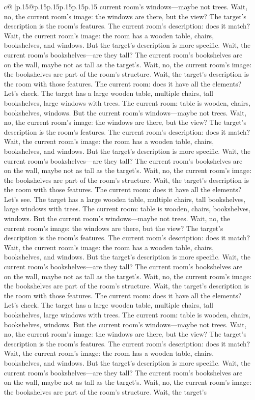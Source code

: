 \documentclass{article}
\begin{document}
{\begin{supertabular}{c@{$\;$}|p{.15\linewidth}@{}p{.15\linewidth}p{.15\linewidth}p{.15\linewidth}p{.15\linewidth}p{.15\linewidth}}
{{{current room's windows—maybe not trees. Wait, no, the current room's image: the windows are there, but the view? The target's description is the room's features. The current room's description: does it match? Wait, the current room's image: the room has a wooden table, chairs, bookshelves, and windows. But the target's description is more specific. Wait, the current room's bookshelves—are they tall? The current room's bookshelves are on the wall, maybe not as tall as the target's. Wait, no, the current room's image: the bookshelves are part of the room's structure. Wait, the target's description is the room with those features. The current room: does it have all the elements? Let's check. The target has a large wooden table, multiple chairs, tall bookshelves, large windows with trees. The current room: table is wooden, chairs, bookshelves, windows. But the current room's windows—maybe not trees. Wait, no, the current room's image: the windows are there, but the view? The target's description is the room's features. The current room's description: does it match? Wait, the current room's image: the room has a wooden table, chairs, bookshelves, and windows. But the target's description is more specific. Wait, the current room's bookshelves—are they tall? The current room's bookshelves are on the wall, maybe not as tall as the target's. Wait, no, the current room's image: the bookshelves are part of the room's structure. Wait, the target's description is the room with those features. The current room: does it have all the elements? Let's see. The target has a large wooden table, multiple chairs, tall bookshelves, large windows with trees. The current room: table is wooden, chairs, bookshelves, windows. But the current room's windows—maybe not trees. Wait, no, the current room's image: the windows are there, but the view? The target's description is the room's features. The current room's description: does it match? Wait, the current room's image: the room has a wooden table, chairs, bookshelves, and windows. But the target's description is more specific. Wait, the current room's bookshelves—are they tall? The current room's bookshelves are on the wall, maybe not as tall as the target's. Wait, no, the current room's image: the bookshelves are part of the room's structure. Wait, the target's description is the room with those features. The current room: does it have all the elements? Let's check. The target has a large wooden table, multiple chairs, tall bookshelves, large windows with trees. The current room: table is wooden, chairs, bookshelves, windows. But the current room's windows—maybe not trees. Wait, no, the current room's image: the windows are there, but the view? The target's description is the room's features. The current room's description: does it match? Wait, the current room's image: the room has a wooden table, chairs, bookshelves, and windows. But the target's description is more specific. Wait, the current room's bookshelves—are they tall? The current room's bookshelves are on the wall, maybe not as tall as the target's. Wait, no, the current room's image: the bookshelves are part of the room's structure. Wait, the target's }}}
\end{supertabular}}
\end{document}
